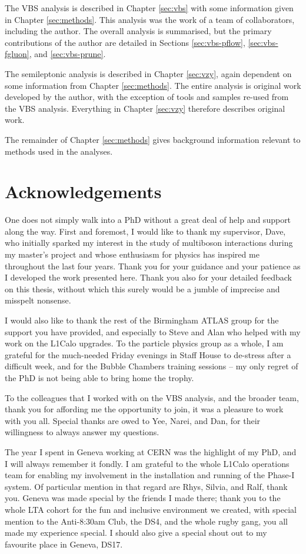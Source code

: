 The \acs{VBS} \Zy analysis is described in Chapter \ref{sec:vbs} with some
information given in Chapter \ref{sec:methods}. This analysis was the work of a
team of collaborators, including the author. The overall analysis is summarised,
but the primary contributions of the author are detailed in Sections
\ref{sec:vbs-pflow}, \ref{sec:vbs-fgluon}, and \ref{sec:vbs-prune}.

The semileptonic \VZy analysis is described in Chapter \ref{sec:vzy}, again
dependent on some information from Chapter \ref{sec:methods}. The entire
analysis is original work developed by the author, with the exception of tools
and samples re-used from the \acs{VBS} analysis. Everything in Chapter
\ref{sec:vzy} therefore describes original work.

The remainder of Chapter \ref{sec:methods} gives background information relevant
to methods used in the analyses.
%
%
\clearpage
\chapter*{Acknowledgements}

One does not simply walk into a PhD without a great deal of help and support
along the way. First and foremost, I would like to thank my supervisor, Dave,
who initially sparked my interest in the study of multiboson interactions during
my master's project and whose enthusiasm for physics has inspired me throughout
the last four years. Thank you for your guidance and your patience as I
developed the work presented here. Thank you also for your detailed feedback on
this thesis, without which this surely would be a jumble of imprecise and
misspelt nonsense.

I would also like to thank the rest of the Birmingham \acs{ATLAS} group for the
support you have provided, and especially to Steve and Alan who helped with
my work on the \acs{L1Calo} upgrades. To the particle physics group as a whole, I am
grateful for the much-needed Friday evenings in Staff House to de-stress after a
difficult week, and for the Bubble Chambers training sessions -- my only regret
of the PhD is not being able to bring home the trophy.

To the colleagues that I worked with on the \acs{VBS} \Zy analysis, and the
broader \Zy team, thank you for affording me the opportunity to join, it was a
pleasure to work with you all. Special thanks are owed to Yee, Narei, and Dan, for
their willingness to always answer my questions.

The year I spent in Geneva working at \acs{CERN} was the highlight of my PhD,
and I will always remember it fondly. I am grateful to the whole \acs{L1Calo}
operations team for enabling my involvement in the installation and running
of the Phase-I system. Of particular mention in that regard are Rhys, Silvia,
and Ralf, thank you. Geneva was made special by the friends I made there; thank
you to the whole LTA cohort for the fun and inclusive environment we created,
with special mention to the Anti-8:30am Club, the DS4, and the whole
rugby gang, you all made my experience special. I should also give a
special shout out to my favourite place in Geneva, DS17.

